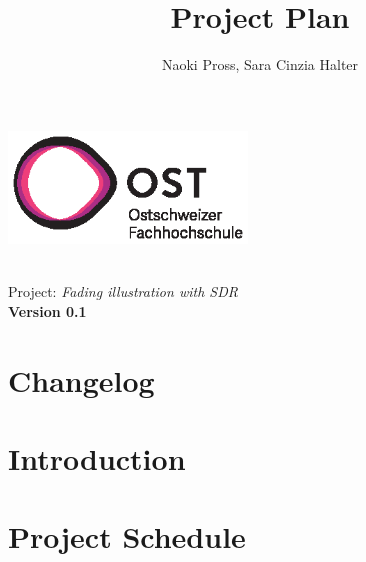 \documentclass[a4paper, twosided, 11pt]{scrartcl}
\title{Project Plan}
\author{Naoki Pross, Sara Cinzia Halter}
\begin{document}
\begin{titlepage}
  \includegraphics[height=3cm]{fig/ost-logo}
  \begin{flushright}
    \vspace{5cm}
    {\Huge \bfseries \thetitle} \\
    \vspace{5mm}
    {\LARGE Project: \textit{Fading illustration with SDR}} \\
    \vspace{5mm}
    {\LARGE \bfseries Version 0.1}
  \end{flushright}
\end{titlepage}

\clearpage

\section{Changelog}
\section{Introduction}

\section{Project Schedule}

\begin{landscape}
	\begin{figure}[h] \centering
		\begin{ganttchart}{1}{12}
			 \\
			 \\
			 \\
			 \\
			 \ganttnewline
			 \ganttnewline
		\end{ganttchart}
	\end{figure}
\end{landscape}
\end{document}
